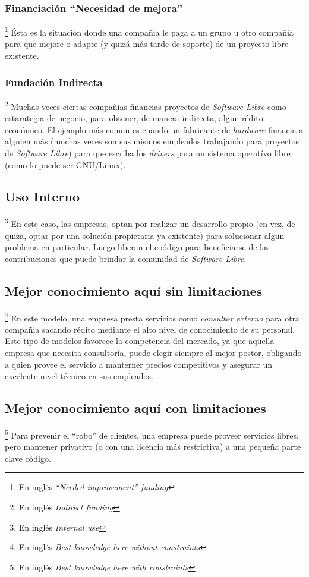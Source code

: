 \subsubsection{Financiaci\'on ``Necesidad de mejora''}\footnote{En ingl\'es
\emph{``Needed improvement'' funding}}
%
\'Esta es la situaci\'on donde una compa\~nia le paga a un grupo u otro
compa\~nia para que mejore o adapte (y quiz\'a m\'as tarde de soporte) de un
proyecto libre existente.

\subsubsection{Fundaci\'on Indirecta}\footnote{En ingl\'es \emph{Indirect
funding}}
%
Muchas veces ciertas compa\~nias financias proyectos de \emph{Software Libre}
como estarategia de negocio, para obtener, de manera indirecta, algun r\'edito
econ\'omico. El ejemplo m\'as comun es cuando un fabricante de \emph{hardware}
financia a alguien m\'as (muchas veces son sus mismos empleados trabajando
para proyectos de \emph{Software Libre}) para que escriba los \emph{drivers}
para un sistema operat\'ivo libre (como lo puede ser GNU/Linux). 

\subsection{Uso Interno}\footnote{En ingl\'es \emph{Internal use}}
%
En este caso, las empresas, optan por realizar un desarrollo propio (en vez,
de quiza, optar por una soluci\'on propietaria ya existente) para solucionar
algun problema en particular. Luego liberan el co\'odigo para beneficiarse de
las contribuciones que puede brindar la comunidad de \emph{Software Libre}.

\subsection{Mejor conocimiento aqu\'i sin limitaciones}\footnote{En ingl\'es
\emph{Best knowledge here without constraints}}
%
En este modelo, una empresa presta servicios como \emph{consultor externo} para
otra compa\~nia sacando r\'edito mediante el alto nivel de conocimiento de su
personal.
Este tipo de modelos favorece la competencia del mercado, ya que aquella
empresa que necesita consultor\'ia, puede elegir siempre al mejor postor,
obligando a quien provee el servicio a manterner precios competitivos y
asegurar un excelente nivel t\'ecnico en sus empleados.

\subsection{Mejor conocimiento aqu\'i con limitaciones}\footnote{En
ingl\'es \emph{Best knowledge here with constraints}}
%
Para prevenir el ``robo'' de clientes, una empresa puede proveer servicios
libres, pero mantener privativo (o con una licencia m\'as restrictiva) a una
peque\~na parte clave c\'odigo.


